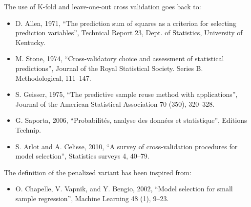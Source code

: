             {
              The use of K-fold and leave-one-out cross validation goes back to:
              \begin{itemize}
              \item D. Allen, 1971, ``The prediction sum of squares as a criterion for selecting prediction variables'', Technical Report 23, Dept. of Statistics, University of Kentucky.
              \end{itemize}
              \begin{itemize}
              \item M. Stone, 1974, ``Cross-validatory choice and assessment of statistical predictions'', Journal of the Royal Statistical Society. Series B.
  Methodological, 111--147.
              \end{itemize}
              \begin{itemize}
              \item S. Geisser, 1975, ``The predictive sample reuse method with applications'', Journal of the American Statistical Association 70 (350), 320--328.
              \end{itemize}
              \begin{itemize}
              \item G. Saporta, 2006, ``Probabilit\'{e}s, analyse des donn\'{e}es et statistique'', Editions Technip.
              \end{itemize}
              \begin{itemize}
              \item S. Arlot and A. Celisse, 2010, ``A survey of cross-validation procedures for model selection'', Statistics surveys 4, 40--79.
              \end{itemize}
              The definition of the penalized variant has been inspired from:
              \begin{itemize}
              \item O. Chapelle, V. Vapnik, and Y. Bengio, 2002, ``Model selection for small sample regression'', Machine Learning 48 (1), 9--23.
              \end{itemize}
            }
